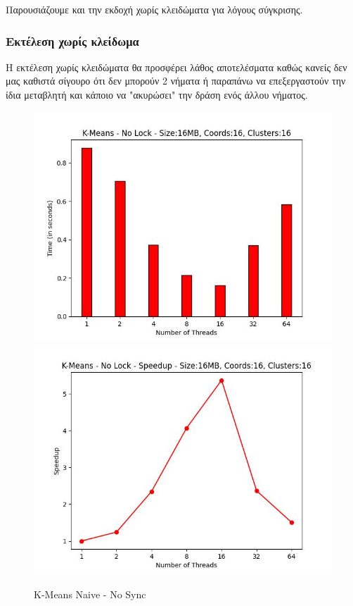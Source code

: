 \documentclass[../final_report.tex]{subfiles}
\begin{document}
Παρουσιάζουμε και την εκδοχή χωρίς κλειδώματα για λόγους σύγκρισης.

\subsubsection{Εκτέλεση χωρίς κλείδωμα}

Η εκτέλεση χωρίς κλειδώματα θα προσφέρει λάθος αποτελέσματα καθώς κανείς δεν μας
καθιστά σίγουρο ότι δεν μπορούν 2 νήματα ή παραπάνω να επεξεργαστούν την ίδια μεταβλητή και 
κάποιο να "ακυρώσει" την δράση ενός άλλου νήματος.

\begin{figure}[H]
    \centering
        \includegraphics[scale=0.48]{outFilesAffinityMouliko/plots/kmeans_locks_nosync.jpg}
        \includegraphics[scale=0.48]{outFilesAffinityMouliko/plots/kmeans_locks_nosync_speedup.jpg}
    \caption{K-Means Naive - No Sync}
    \label{fig:K-Means Naive - No Sync}
\end{figure}
\end{document}
